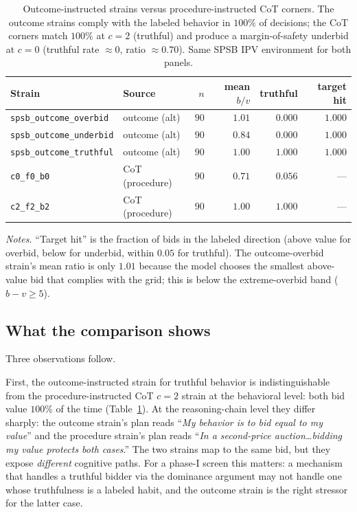 \documentclass[12pt]{article}
\begin{document}
\begin{table}[t]
\centering
\caption{Outcome-instructed strains versus procedure-instructed
CoT corners. The outcome strains comply with the labeled behavior in
$100\%$ of decisions; the CoT corners match $100\%$ at $c{=}2$
(truthful) and produce a margin-of-safety underbid at $c{=}0$
(truthful rate $\approx 0$, ratio $\approx 0.70$). Same SPSB IPV
environment for both panels.}
\label{tab:outcome}
\footnotesize
\setlength{\tabcolsep}{6pt}
\begin{tabular}{@{}llrrrr@{}}
\toprule
Strain & Source & $n$ & mean $b/v$ & truthful & target hit \\
\midrule
\texttt{spsb\_outcome\_overbid}    & outcome (alt)            & $90$  & $1.01$ & $0.000$ & $1.000$ \\
\texttt{spsb\_outcome\_underbid}   & outcome (alt)            & $90$  & $0.84$ & $0.000$ & $1.000$ \\
\texttt{spsb\_outcome\_truthful}   & outcome (alt)            & $90$  & $1.00$ & $1.000$ & $1.000$ \\
\addlinespace
\texttt{c0\_f0\_b0}                & CoT (procedure)          & $90$  & $0.71$ & $0.056$ & --- \\
\texttt{c2\_f2\_b2}                & CoT (procedure)          & $90$  & $1.00$ & $1.000$ & --- \\
\bottomrule
\end{tabular}

\vspace{0.4em}
\begin{minipage}{0.95\textwidth}
{\footnotesize\textit{Notes.} ``Target hit'' is the fraction of bids
in the labeled direction (above value for overbid, below for
underbid, within $0.05$ for truthful). The outcome-overbid strain's
mean ratio is only $1.01$ because the model chooses the smallest
above-value bid that complies with the grid; this is below the
extreme-overbid band ($b-v\ge 5$).\par}
\end{minipage}
\end{table}

\subsection{What the comparison shows}

Three observations follow.

First, the outcome-instructed strain for truthful behavior is
indistinguishable from the procedure-instructed CoT $c{=}2$
strain at the behavioral level: both bid value $100\%$ of the time
(Table~\ref{tab:outcome}). At the reasoning-chain level they differ
sharply: the outcome strain's plan reads
``\emph{My behavior is to bid equal to my value}'' and the
procedure strain's plan reads
``\emph{In a second-price auction\dots bidding my value protects both
cases}.'' The two strains map to the same bid, but they expose
\emph{different} cognitive paths. For a phase-I screen this matters:
a mechanism that handles a truthful bidder via the dominance argument
may not handle one whose truthfulness is a labeled habit, and the
outcome strain is the right stressor for the latter case.
\end{document}
